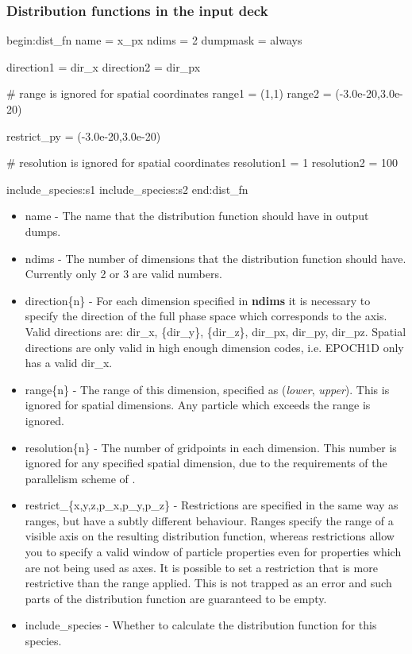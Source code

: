\documentclass[12pt,a4paper]{article}
\newcommand{\EPOCH}{{\color{warwickdark}\fontfamily{phv}\selectfont{EPOCH}}}
\newenvironment{boxverbatim}{\lboxverbatim{none}}{\endlboxverbatim}
\begin{document}
\subsubsection{Distribution functions in the input deck}
\begin{boxverbatim}
begin:dist_fn
   name = x_px
   ndims = 2
   dumpmask = always

   direction1 = dir_x
   direction2 = dir_px

   # range is ignored for spatial coordinates
   range1 = (1,1)
   range2 = (-3.0e-20,3.0e-20)

   restrict_py = (-3.0e-20,3.0e-20)

   # resolution is ignored for spatial coordinates
   resolution1 = 1
   resolution2 = 100

   include_species:s1
   include_species:s2
end:dist_fn
\end{boxverbatim}
\begin{itemize}
\item name - The name that the distribution function should have in output
  dumps.
\item ndims - The number of dimensions that the distribution function should
  have. Currently only 2 or 3 are valid numbers.
\item direction\{n\} - For each dimension specified in {\bf ndims} it is
  necessary to specify the direction of the full phase space which corresponds
  to the axis. Valid directions are: dir\_x, \{dir\_y\}, \{dir\_z\}, dir\_px,
  dir\_py, dir\_pz. Spatial directions are only valid in high enough dimension
  codes, i.e. EPOCH1D only has a valid dir\_x.
\item range\{n\} - The range of this dimension, specified as ({\it lower},{\it
    upper}). This is ignored for spatial dimensions. Any particle which exceeds
  the range is ignored.
\item resolution\{n\} - The number of gridpoints in each dimension. This
  number is ignored for any specified spatial dimension, due to the
  requirements of the parallelism scheme of {\EPOCH}.
\item restrict\_\{x,y,z,p\_x,p\_y,p\_z\} - Restrictions are specified in the
  same way as ranges, but have a subtly different behaviour. Ranges specify
  the range of a visible axis on the resulting distribution function, whereas
  restrictions allow you to specify a valid window of particle properties even
  for properties which are not being used as axes. It is possible to set a
  restriction that is more restrictive than the range applied. This is not
  trapped as an error and such parts of the distribution function are
  guaranteed to be empty.
\item include\_species - Whether to calculate the distribution function
  for this species.
\end{itemize}
\end{document}
